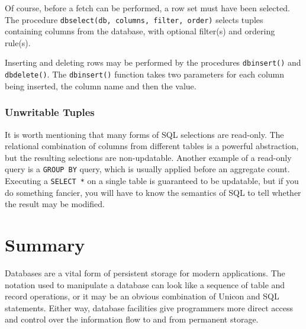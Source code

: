 Of course, before a fetch can be performed, a row set must have been
selected. The procedure \texttt{dbselect(db, columns, filter, order)}
selects tuples containing columns from the database, with optional
filter(s) and ordering rule(s).

Inserting and deleting rows may be performed by the procedures
\texttt{dbinsert()} and \texttt{dbdelete()}. The \texttt{dbinsert()}
function takes two parameters for each column being inserted, the
column name and then the value.

\subsubsection{Unwritable Tuples}

It is worth mentioning that many forms of SQL selections are read-only.
The relational combination of columns from different tables is a
powerful abstraction, but the resulting selections are non-updatable.
Another example of a read-only query is a \texttt{GROUP BY} query,
which is usually applied before an aggregate count. Executing a
\texttt{SELECT *} on a single table is guaranteed to be updatable, but
if you do something fancier, you will have to know the semantics of SQL
to tell whether the result may be modified.

\section*{Summary}

Databases are a vital form of persistent storage for modern
applications. The notation used to manipulate a database can look like
a sequence of table and record operations, or it may be an obvious
combination of Unicon and SQL statements. Either way, database
facilities give programmers more direct access and control over the
information flow to and from permanent storage.


\bigskip

